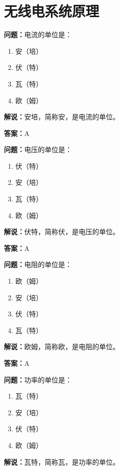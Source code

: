 \chapter{无线电系统原理}


\textbf{问题：}电流的单位是：

\begin{enumerate}[label=\Alph*), leftmargin=3em]
	\item 安（培）
	\item 伏（特）
	\item 瓦（特）
	\item 欧（姆）
\end{enumerate}

\textbf{解说：}安培，简称安，是电流的单位。

\textbf{答案：}A

\textbf{问题：}电压的单位是：

\begin{enumerate}[label=\Alph*), leftmargin=3em]
	\item 伏（特）
	\item 安（培）
	\item 瓦（特）
	\item 欧（姆）
\end{enumerate}

\textbf{解说：}伏特，简称伏，是电压的单位。

\textbf{答案：}A

\textbf{问题：}电阻的单位是：

\begin{enumerate}[label=\Alph*), leftmargin=3em]
	\item 欧（姆）
	\item 安（培）
	\item 伏（特）
	\item 瓦（特）
\end{enumerate}

\textbf{解说：}欧姆，简称欧，是电阻的单位。

\textbf{答案：}A

\textbf{问题：}功率的单位是：

\begin{enumerate}[label=\Alph*), leftmargin=3em]
	\item 瓦（特）
	\item 安（培）
	\item 伏（特）
	\item 欧（姆）
\end{enumerate}

\textbf{解说：}瓦特，简称瓦，是功率的单位。

